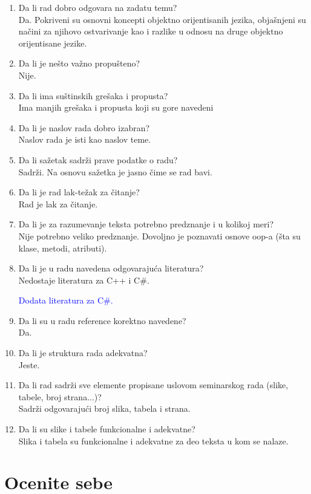 \documentclass[a4paper]{report}
\newcommand{\odgovor}[1]{\textcolor{blue}{#1}}
\begin{document}
\begin{enumerate}
\item Da li rad dobro odgovara na zadatu temu?\\
Da. Pokriveni su osnovni koncepti objektno orijentisanih jezika, obja\v snjeni su na\v cini za njihovo ostvarivanje kao i razlike u odnosu na druge objektno orijentisane jezike.
\item Da li je nešto važno propušteno?\\
Nije.
\item Da li ima suštinskih grešaka i propusta?\\
Ima manjih gre\v saka i propusta koji su gore navedeni
\item Da li je naslov rada dobro izabran?\\
Naslov rada je isti kao naslov teme.
\item Da li sažetak sadrži prave podatke o radu?\\
Sadr\v zi. Na osnovu sa\v zetka je jasno \v cime se rad bavi.
\item Da li je rad lak-težak za čitanje?\\
Rad je lak za \v citanje.
\item Da li je za razumevanje teksta potrebno predznanje i u kolikoj meri?\\
Nije potrebno veliko predznanje. Dovoljno je poznavati osnove oop-a (\v sta su klase, metodi, atributi).
\item Da li je u radu navedena odgovarajuća literatura?\\
Nedostaje literatura za C++ i C\#.

\odgovor{
Dodata literatura za C\#.
}

\item Da li su u radu reference korektno navedene?\\
Da.
\item Da li je struktura rada adekvatna?\\
Jeste.
\item Da li rad sadrži sve elemente propisane uslovom seminarskog rada (slike, tabele, broj strana...)?\\
Sadr\v zi odgovaraju\'ci broj slika, tabela i strana.
\item Da li su slike i tabele funkcionalne i adekvatne?\\
Slika i tabela su funkcionalne i adekvatne za deo teksta u kom se nalaze.
\end{enumerate}

\section{Ocenite sebe}
\end{document}
